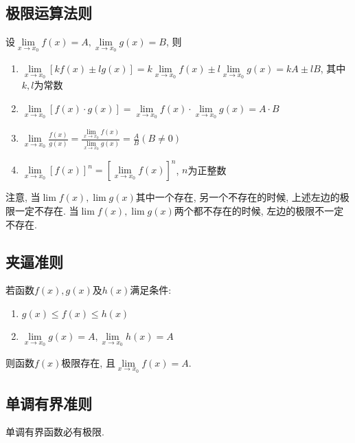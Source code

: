 \subsection{极限运算法则}
设$ \lim\limits_{x\rightarrow x_{0}}f(x)=A, \lim\limits_{x\rightarrow x_{0}}g(x)=B $, 则
\begin{enumerate}
\item $ \lim\limits_{x\rightarrow x_{0}}[kf(x)\pm lg(x)]=k \lim\limits_{x\rightarrow x_{0}}f(x)\pm l \lim\limits_{x\rightarrow x_{0}}g(x)=kA\pm lB $, 其中$ k,l $为常数
\item $ \lim\limits_{x\rightarrow x_{0}}[f(x)\cdot g(x)]=\lim\limits_{x\rightarrow x_{0}}f(x)\cdot \lim\limits_{x\rightarrow x_{0}}g(x)=A\cdot B $
\item $ \lim\limits_{x\rightarrow x_{0}}\frac{f(x)}{g(x)}=\frac{\lim\limits_{x\rightarrow x_{0}}f(x)}{\lim\limits_{x\rightarrow x_{0}}g(x)}=\frac{A}{B}(B\neq 0) $
\item $ \lim\limits_{x\rightarrow x_{0}}[f(x)]^{n}=[\lim\limits_{x\rightarrow x_{0}}f(x)]^{n} $, $ n $为正整数
\end{enumerate}\par
注意, 当$ \lim\limits f(x), \lim\limits g(x) $其中一个存在, 另一个不存在的时候, 上述左边的极限一定不存在. 当$ \lim\limits f(x), \lim\limits g(x) $两个都不存在的时候, 左边的极限不一定不存在.
\subsection{夹逼准则}\label{夹逼定理}
若函数$ f(x), g(x) $及$ h(x) $满足条件:
\begin{enumerate}
\item $ g(x)\le f(x)\le h(x) $
\item $ \lim\limits_{x\rightarrow x_{0}}g(x)=A, \lim\limits_{x\rightarrow x_{0}}h(x)=A $
\end{enumerate}\par
则函数$ f(x) $极限存在, 且$ \lim\limits_{x\rightarrow x_{0}}f(x)=A $.
\subsection{单调有界准则}
单调有界函数必有极限.
